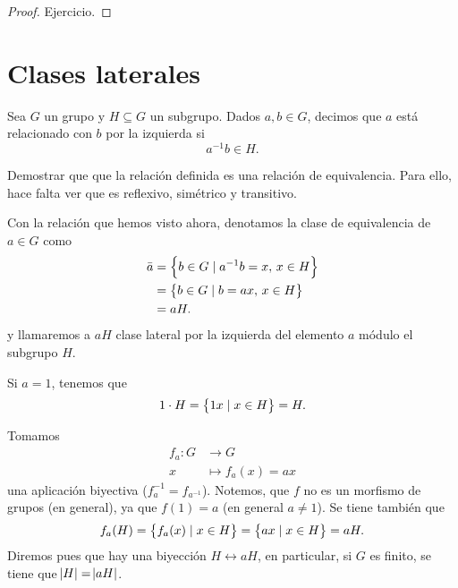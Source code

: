 \begin{proof}
    Ejercicio.
\end{proof}

\section{Clases laterales}

\begin{defi}
    Sea $G$ un grupo y $H \subseteq G$ un subgrupo. Dados $a, b \in G$, decimos que
    $a$ está relacionado con $b$ por la izquierda si
    \[
        a^{-1}b \in H.
    \]
\end{defi}

\begin{ej}
    Demostrar que que la relación definida es una relación de equivalencia. Para ello, hace falta ver que es
    reflexivo, simétrico y transitivo.
\end{ej}

\begin{defi}
    Con la relación que hemos visto ahora, denotamos la clase de equivalencia de $a \in G$ como
    \[
        \begin{aligned}
            \bar{a} &= \left\{b \in G \mid a^{-1}b = x, \, x \in H\right\} \\ &=
            \left\{b \in G \mid b = ax, \, x \in H\right\} \\&= aH.
        \end{aligned}
    \]
    y llamaremos a $aH$ clase lateral por la izquierda del elemento $a$ módulo el subgrupo $H$.
\end{defi}

\begin{example}
    Si $a = 1$, tenemos que
    \[
        1\cdot H = \left\{1x \mid x \in H\right\} = H.
    \]
\end{example}

\begin{obs}
    Tomamos
    \[
        \begin{aligned}
            f_a \colon G &\to G \\
            x &\mapsto f_a(x) = ax
        \end{aligned}
    \]
    una aplicación biyectiva ($f^{-1}_a = f_{a^{-1}}$). Notemos, que $f$ no es un morfismo
    de grupos (en general), ya que $f(1) = a$ (en general $a \neq 1$). Se tiene también que
    \[
        f_a(H) = \left\{f_a(x) \mid x \in H\right\} = \left\{ax \mid x \in H\right\} = aH.
    \]
    Diremos pues que hay una biyección $H \leftrightarrow aH$, en particular, si $G$ es finito, se tiene que
    $\abs{H} = \abs{aH}$.
\end{obs}

